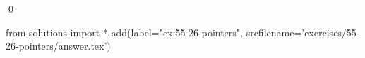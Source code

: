 
\begin{ex}
  \label{ex:55-26-pointers}
  
  \qed
\end{ex}
\begin{python0}
from solutions import *
add(label="ex:55-26-pointers",
    srcfilename='exercises/55-26-pointers/answer.tex')
\end{python0}
